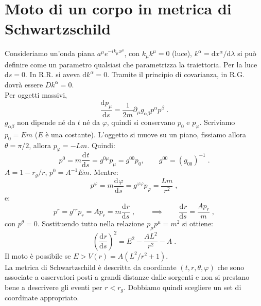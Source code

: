 \documentclass[12pt,a4paper]{report}
\theoremstyle{definition}
\newcommand{\dev}[3][]{\frac{\mathrm{d}^{#1} #2}{\mathrm{d} #3^{#1}}}
\newcommand{\diff}[1][]{\mathrm{d}#1}
\begin{document}
\section{Moto di un corpo in metrica di Schwartzschild}
Consideriamo un'onda piana $a^{\mu}e^{-ik_{\mu}x^{\mu}}$, con $k_{\mu}k^{\mu}=0$ (luce), $k^{\alpha}=\diff{x^{\alpha}}/\diff{\lambda}$ si può definire come un parametro qualsiasi che parametrizza la traiettoria. Per la luce $\diff{s}=0$. In R.R. si aveva $\diff{k^{\alpha}}=0$. Tramite il principio di covarianza, in R.G. dovrà essere $Dk^{\alpha}=0$. \\
Per oggetti massivi,
$$
\dev{p_{\mu}}{s}=\frac{1}{2m}\partial_{\mu}g_{\alpha\beta}p^{\alpha}p^{\beta}\;.
$$
$g_{\alpha\beta}$ non dipende né da $t$ né da $\varphi$, quindi si conservano $p_0$ e $p_{\varphi}$. Scriviamo $p_0=Em$ ($E$ è una costante). L'oggetto si muove su un piano, fissiamo allora $\theta=\pi/2$, allora $p_{\varphi}=-Lm$. Quindi:
\begin{equation}
p^0=m\dev{t}{s}=g^{0\mu}p_{\mu}=g^{00}p_0,\qquad g^{00}=(g_{00})^{-1}\;.
\end{equation}
$A=1-r_g/r$, $p^0=A^{-1}Em$. Mentre:
\begin{equation}
p^{\varphi}=m\dev{\varphi}{s}=g^{\varphi\varphi}p_{\varphi}=\frac{Lm}{r^2}\;,
\end{equation}
e:
\begin{equation}
p^r=g^{rr}p_r=Ap_r=m\dev{r}{s}\;,\qquad \implies \qquad \dev{r}{s}=\frac{Ap_r}{m}\;,
\end{equation}
con $p^{\theta}=0$. Sostituendo tutto nella relazione $p_{\mu}p^{\mu}=m^2$ si ottiene:
\begin{equation}
\left(\dev{r}{s}\right)^2=E^2-\frac{AL^2}{r^2}-A\;.
\end{equation}
Il moto è possibile se $E>V(r)=A(L^2/r^2+1)$. \\
La metrica di Schwartzschild è descritta da coordinate $(t,r,\theta,\varphi)$ che sono associate a osservatori posti a grandi distanze dalle sorgenti e non si prestano bene a descrivere gli eventi per $r<r_g$. Dobbiamo quindi scegliere un set di coordinate appropriato.
\end{document}

